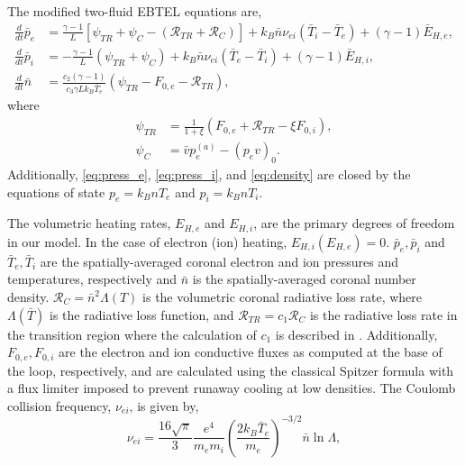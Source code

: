 \documentclass[tighten,apj]{emulateapj}
\begin{document}
	\section{}
	\label{appendix}
	The modified two-fluid EBTEL equations are,
		\begin{align}
			\frac{d}{dt}\bar{p}_e &= \frac{\gamma - 1}{L}[\psi_{TR} + \psi_C -(\mathcal{R}_{TR} + \mathcal{R}_C)] + k_B\bar{n}\nu_{ei}(\bar{T}_i-\bar{T}_e) + (\gamma-1)\bar{E}_{H,e},\label{eq:press_e} \\[0.5em]
			\frac{d}{dt}\bar{p}_i &= -\frac{\gamma - 1}{L}(\psi_{TR} + \psi_C) + k_B\bar{n}\nu_{ei}(\bar{T}_e-\bar{T}_i) + (\gamma-1)\bar{E}_{H,i},\label{eq:press_i} \\[0.5em]
			\frac{d}{dt}\bar{n} &= \frac{c_2(\gamma-1)}{c_3\gamma Lk_B\bar{T}_e}(\psi_{TR} - F_{0,e}-\mathcal{R}_{TR}), 	\label{eq:density}
		\end{align}
		where 
		\begin{align}
			\psi_{TR} &= \frac{1}{1 + \xi}(F_{0,e} + \mathcal{R}_{TR} - \xi F_{0,i}), \label{eq:psi_tr}\\[0.5em]
			\psi_C  &= \bar{v}p_e^{(a)} - (p_ev)_0. \label{eq:psi_C}
		\end{align}
		Additionally, \autoref{eq:press_e}, \autoref{eq:press_i}, and \autoref{eq:density} are closed by the equations of state $p_e=k_BnT_e$ and $p_i=k_BnT_i$. 
		\par The volumetric heating rates, $E_{H,e}$ and $E_{H,i}$, are the primary degrees of freedom in our model. In the case of electron (ion) heating, $E_{H,i}(E_{H,e})=0$. $\bar{p}_e,\bar{p}_i$ and $\bar{T}_e,\bar{T}_i$ are the spatially-averaged coronal electron and ion pressures and temperatures, respectively and $\bar{n}$ is the spatially-averaged coronal number density. $\mathcal{R}_C=\bar{n}^2\Lambda(T)$ is the volumetric coronal radiative loss rate, where $\Lambda(\bar{T})$ is the radiative loss function, and $\mathcal{R}_{TR}=c_1\mathcal{R}_C$ is the radiative loss rate in the transition region where the calculation of $c_1$ is described in \citet{cargill_enthalpy-based_2012}. Additionally, $F_{0,e},F_{0,i}$ are the electron and ion conductive fluxes as computed at the base of the loop, respectively, and are calculated using the classical Spitzer formula with a flux limiter imposed to prevent runaway cooling at low densities. The Coulomb collision frequency, $\nu_{ei}$, is given by,
		\begin{equation}
			\nu_{ei} = \frac{16\sqrt{\pi}}{3}\frac{e^4}{m_em_i}\left(\frac{2k_B\bar{T}_e}{m_e}\right)^{-3/2}\bar{n}\ln{\Lambda},
			\label{eq:col_freq}
		\end{equation}
\end{document}
